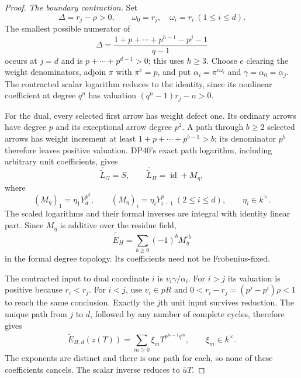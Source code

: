 \documentclass[11pt,a4paper]{article}
\theoremstyle{definition}\newtheorem{remark}[theorem]{Remark}
\newcommand{\id}{\operatorname{id}}\newcommand{\Hom}{\operatorname{Hom}}
\begin{document}
\begin{proof}
\emph{The boundary contraction.}
Set
\[
 \Delta=r_j-\rho>0,\qquad
 \omega_0=r_j,\quad\omega_i=r_i\ (1\le i\le d).
\]
The smallest possible numerator of
\[
 \Delta=\frac{1+p+\cdots+p^{h-1}-p^j-1}{q-1}
\]
occurs at $j=d$ and is $p+\cdots+p^{d-1}>0$; this uses $h\ge3$.
Choose $e$ clearing the weight denominators, adjoin $\pi$ with $\pi^e=p$, and put
$\alpha_i=\pi^{e\omega_i}$ and $\gamma=\alpha_0=\alpha_j$.
The contracted scalar logarithm reduces to the identity, since its nonlinear coefficient at degree $q^n$ has valuation
$(q^n-1)r_j-n>0$.

For the dual, every selected first arrow has weight defect one. Its ordinary arrows have degree $p$ and its exceptional arrow degree $p^2$.
A path through $b\ge2$ selected arrows has weight increment at least
$1+p+\cdots+p^{b-1}>b$; its denominator $p^b$ therefore leaves positive valuation.
DP40's exact path logarithm, including arbitrary unit coefficients, gives
\begin{equation}\label{eq:nonunitreducedlog}
 \overline{\widetilde L}_G=S,\qquad
 \overline{\widetilde L}_H=\id+M_\eta,
\end{equation}
where
\[
 (M_\eta)_1=\eta_1Y_d^{p^2},\qquad
 (M_\eta)_i=\eta_iY_{i-1}^p\ (2\le i\le d),
 \qquad\eta_i\in k^\times.
\]
The scaled logarithms and their formal inverses are integral with identity linear part. Since $M_\eta$ is additive over the residue field,
\[
 \overline{\widetilde E}_H
       =\sum_{b\ge0}(-1)^bM_\eta^{\circ b}
\]
in the formal degree topology. Its coefficients need not be Frobenius-fixed.

The contracted input to dual coordinate $i$ is $v_i\gamma/\alpha_i$.
For $i>j$ its valuation is positive because $r_i<r_j$.
For $i<j$, use $v_i\in pR$ and
$0<r_i-r_j=(p^j-p^i)\rho<1$ to reach the same conclusion.
Exactly the $j$th unit input survives reduction.
The unique path from $j$ to $d$, followed by any number of complete cycles, therefore gives
\begin{equation}\label{eq:nonunitinversecycle}
 \overline{\widetilde E}_{H,d}(z(T))
       =\sum_{m\ge0}\xi_mT^{p^{k_*-1}q^m},
       \qquad\xi_m\in k^\times.
\end{equation}
The exponents are distinct and there is one path for each, so none of these coefficients cancels. The scalar inverse reduces to $\bar uT$.


\end{proof}
\end{document}
